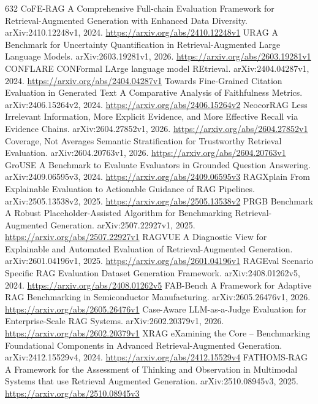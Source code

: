 \documentclass[11pt]{article}
\begin{document}
\begin{thebibliography}{632}
 CoFE-RAG A Comprehensive Full-chain Evaluation Framework for Retrieval-Augmented Generation with Enhanced Data Diversity. arXiv:2410.12248v1, 2024. \url{https://arxiv.org/abs/2410.12248v1}
 URAG A Benchmark for Uncertainty Quantification in Retrieval-Augmented Large Language Models. arXiv:2603.19281v1, 2026. \url{https://arxiv.org/abs/2603.19281v1}
 CONFLARE CONFormal LArge language model REtrieval. arXiv:2404.04287v1, 2024. \url{https://arxiv.org/abs/2404.04287v1}
 Towards Fine-Grained Citation Evaluation in Generated Text A Comparative Analysis of Faithfulness Metrics. arXiv:2406.15264v2, 2024. \url{https://arxiv.org/abs/2406.15264v2}
 NeocorRAG Less Irrelevant Information, More Explicit Evidence, and More Effective Recall via Evidence Chains. arXiv:2604.27852v1, 2026. \url{https://arxiv.org/abs/2604.27852v1}
 Coverage, Not Averages Semantic Stratification for Trustworthy Retrieval Evaluation. arXiv:2604.20763v1, 2026. \url{https://arxiv.org/abs/2604.20763v1}
 GroUSE A Benchmark to Evaluate Evaluators in Grounded Question Answering. arXiv:2409.06595v3, 2024. \url{https://arxiv.org/abs/2409.06595v3}
 RAGXplain From Explainable Evaluation to Actionable Guidance of RAG Pipelines. arXiv:2505.13538v2, 2025. \url{https://arxiv.org/abs/2505.13538v2}
 PRGB Benchmark A Robust Placeholder-Assisted Algorithm for Benchmarking Retrieval-Augmented Generation. arXiv:2507.22927v1, 2025. \url{https://arxiv.org/abs/2507.22927v1}
 RAGVUE A Diagnostic View for Explainable and Automated Evaluation of Retrieval-Augmented Generation. arXiv:2601.04196v1, 2025. \url{https://arxiv.org/abs/2601.04196v1}
 RAGEval Scenario Specific RAG Evaluation Dataset Generation Framework. arXiv:2408.01262v5, 2024. \url{https://arxiv.org/abs/2408.01262v5}
 FAB-Bench A Framework for Adaptive RAG Benchmarking in Semiconductor Manufacturing. arXiv:2605.26476v1, 2026. \url{https://arxiv.org/abs/2605.26476v1}
 Case-Aware LLM-as-a-Judge Evaluation for Enterprise-Scale RAG Systems. arXiv:2602.20379v1, 2026. \url{https://arxiv.org/abs/2602.20379v1}
 XRAG eXamining the Core -- Benchmarking Foundational Components in Advanced Retrieval-Augmented Generation. arXiv:2412.15529v4, 2024. \url{https://arxiv.org/abs/2412.15529v4}
 FATHOMS-RAG A Framework for the Assessment of Thinking and Observation in Multimodal Systems that use Retrieval Augmented Generation. arXiv:2510.08945v3, 2025. \url{https://arxiv.org/abs/2510.08945v3}

\end{thebibliography}
\end{document}
